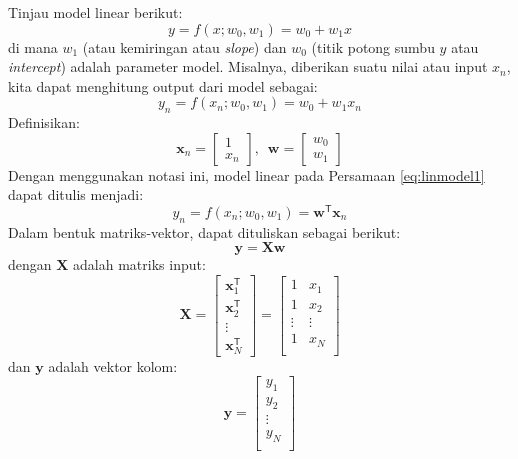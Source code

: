 Tinjau model linear berikut:
\begin{equation}
y = f(x; w_{0}, w_{1}) = w_{0} + w_{1}x
\end{equation}
di mana $w_{1}$ (atau kemiringan atau \textit{slope}) dan $w_{0}$
(titik potong sumbu $y$ atau \textit{intercept}) adalah parameter model.
Misalnya, diberikan suatu nilai atau input $x_{n}$, kita dapat menghitung output dari model
sebagai:
\begin{equation}
y_{n} = f(x_{n}; w_{0}, w_{1}) = w_{0} + w_{1}x_{n}
\label{eq:linmodel1}
\end{equation}
Definisikan:
\begin{equation}
\mathbf{x}_{n} = \begin{bmatrix}
1 \\
x_{n}
\end{bmatrix}
,\,\,\,%
\mathbf{w} = \begin{bmatrix}
w_{0} \\
w_{1}
\end{bmatrix}
\end{equation}
Dengan menggunakan notasi ini, model linear pada Persamaan \eqref{eq:linmodel1} dapat ditulis
menjadi:
\begin{equation}
y_{n} = f(x_{n}; w_0, w_1) = \mathbf{w}^{\mathsf{T}} \mathbf{x}_{n}
\label{eq:linmodel2}
\end{equation}
Dalam bentuk matriks-vektor, dapat dituliskan sebagai berikut:
\begin{equation}
\mathbf{y} = \mathbf{X}\mathbf{w}
\end{equation}
dengan $\mathbf{X}$ adalah matriks input:
\begin{equation}
\mathbf{X} = \begin{bmatrix}
\mathbf{x}^{\mathsf{T}}_{1} \\
\mathbf{x}^{\mathsf{T}}_{2} \\
\vdots \\
\mathbf{x}^{\mathsf{T}}_{N}
\end{bmatrix} =
\begin{bmatrix}
1 & x_{1} \\
1 & x_{2} \\
\vdots & \vdots \\
1 & x_{N} \\
\end{bmatrix}
\end{equation}
dan $\mathbf{y}$ adalah vektor kolom:
\begin{equation}
\mathbf{y} =
\begin{bmatrix}
y_{1} \\
y_{2} \\
\vdots \\
y_{N} \\
\end{bmatrix}
\end{equation}

